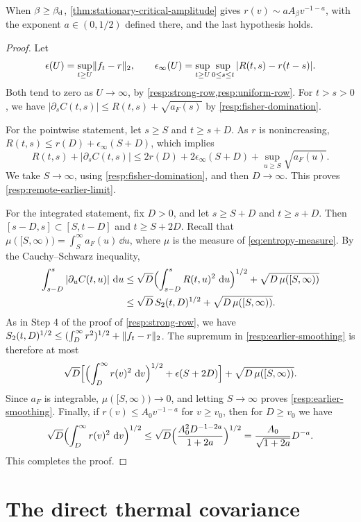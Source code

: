 When $\beta\ge\beta_{\mathrm d}$, \cref{thm:stationary-critical-amplitude} gives $r(v)\sim aA_\beta v^{-1-a}$, with the exponent $a\in(0,1/2)$ defined there, and the last hypothesis holds.

\begin{proof}
Let
\[
 \epsilon(U)=\sup_{t\ge U}\lVert f_t-r\rVert_2,\qquad
 \epsilon_\infty(U)=\sup_{t\ge U}\sup_{0\le s\le t}|R(t,s)-r(t-s)|.
\]
Both tend to zero as $U\to\infty$, by \cref{resp:strong-row,resp:uniform-row}. For $t>s>0$, we have $|\partial_sC(t,s)|\le R(t,s)+\sqrt{a_F(s)}$ by \eqref{resp:fisher-domination}.

For the pointwise statement, let $s\ge S$ and $t\ge s+D$. As $r$ is nonincreasing, $R(t,s)\le r(D)+\epsilon_\infty(S+D)$, which implies
\[
 R(t,s)+|\partial_sC(t,s)|\le2r(D)+2\epsilon_\infty(S+D)+\sup_{u\ge S}\sqrt{a_F(u)}.
\]
We take $S\to\infty$, using \eqref{resp:fisher-domination}, and then $D\to\infty$. This proves \eqref{resp:remote-earlier-limit}.

For the integrated statement, fix $D>0$, and let $s\ge S+D$ and $t\ge s+D$. Then $[s-D,s]\subset[S,t-D]$ and $t\ge S+2D$. Recall that $\mu([S,\infty))=\int_S^\infty a_F(u)\,\dd u$, where $\mu$ is the measure of \eqref{eq:entropy-measure}. By the Cauchy--Schwarz inequality,
\[
\begin{aligned}
 \int_{s-D}^s|\partial_uC(t,u)|\,\mathop{}\!\mathrm d u
 &\le\sqrt D\Bigl(\int_{s-D}^sR(t,u)^2\,\mathop{}\!\mathrm d u\Bigr)^{1/2}+\sqrt{D\,\mu([S,\infty))}\\
 &\le\sqrt D\,S_2(t,D)^{1/2}+\sqrt{D\,\mu([S,\infty))}.
\end{aligned}
\]
As in Step 4 of the proof of \cref{resp:strong-row}, we have $S_2(t,D)^{1/2}\le(\int_D^\infty r^2)^{1/2}+\lVert f_t-r\rVert_2$. The supremum in \eqref{resp:earlier-smoothing} is therefore at most
\[
 \sqrt D\Bigl[\Bigl(\int_D^\infty r(v)^2\,\mathop{}\!\mathrm d v\Bigr)^{1/2}+\epsilon(S+2D)\Bigr]+\sqrt{D\,\mu([S,\infty))}.
\]
Since $a_F$ is integrable, $\mu([S,\infty))\to0$, and letting $S\to\infty$ proves \eqref{resp:earlier-smoothing}. Finally, if $r(v)\le A_0v^{-1-a}$ for $v\ge v_0$, then for $D\ge v_0$ we have
\[
 \sqrt D\Bigl(\int_D^\infty r(v)^2\,\mathop{}\!\mathrm d v\Bigr)^{1/2}\le\sqrt D\Bigl(\frac{A_0^2D^{-1-2a}}{1+2a}\Bigr)^{1/2}=\frac{A_0}{\sqrt{1+2a}}D^{-a}.
\]
This completes the proof.
\end{proof}

\section{The direct thermal covariance}\label{sec:resp-thermal}

